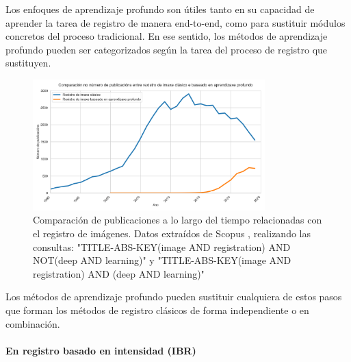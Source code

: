 Los enfoques de aprendizaje profundo son útiles tanto en su capacidad de aprender la tarea de registro de manera end-to-end, como para sustituir módulos concretos del proceso tradicional.
En ese sentido, los métodos de aprendizaje profundo pueden ser categorizados según la tarea del proceso de registro que sustituyen.

\begin{figure}[tbp]
\centering
\includegraphics[width=0.8\textwidth]{imaxes/methods_comp.png}
\caption{Comparación de publicaciones a lo largo del tiempo relacionadas con el registro de imágenes. Datos extraídos de Scopus \cite{scopus}, realizando las consultas: "TITLE-ABS-KEY(image AND registration) AND NOT(deep AND learning)" y "TITLE-ABS-KEY(image AND registration) AND (deep AND learning)"}
\label{fig:method_comp}
\end{figure}

Los métodos de aprendizaje profundo pueden sustituir cualquiera de estos pasos que forman los métodos de registro clásicos de forma independiente o en combinación.

\paragraph{En registro basado en intensidad (IBR)}
\label{par:IBR_substitution}

